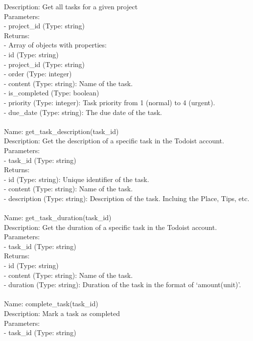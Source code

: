 \begin{tcolorbox}[breakable,title=Prompt Details for Todo]
Description: Get all tasks for a given project\\
Parameters:\\
- project\_id (Type: string)\\
Returns:\\
- Array of objects with properties:\\
  - id (Type: string)\\
  - project\_id (Type: string)\\
  - order (Type: integer)\\
  - content (Type: string): Name of the task.\\
  - is\_completed (Type: boolean)\\
  - priority (Type: integer): Task priority from 1 (normal) to 4 (urgent).\\
  - due\_date (Type: string): The due date of the task.\\
\\
Name: get\_task\_description(task\_id)\\
Description: Get the description of a specific task in the Todoist account.\\
Parameters:\\
- task\_id (Type: string)\\
Returns:\\
- id (Type: string): Unique identifier of the task.\\
- content (Type: string): Name of the task.\\
- description (Type: string): Description of the task. Incluing the Place, Tips, etc.\\
\\
Name: get\_task\_duration(task\_id)\\
Description: Get the duration of a specific task in the Todoist account.\\
Parameters:\\
- task\_id (Type: string)\\
Returns:\\
- id (Type: string)\\
- content (Type: string): Name of the task.\\
- duration (Type: string): Duration of the task in the format of `amount(unit)'.\\
\\
Name: complete\_task(task\_id)\\
Description: Mark a task as completed\\
Parameters:\\
- task\_id (Type: string)\\

\end{tcolorbox}
